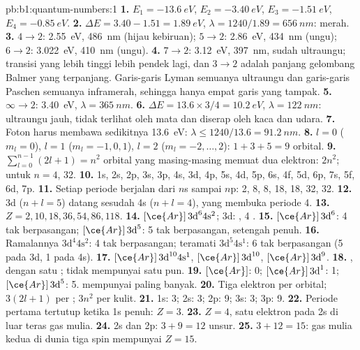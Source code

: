 \begin{solution}{pb:b1:quantum-numbers:1}
\textbf{1.} $E_1 = \qty{-13.6}{eV}$, $E_2 = \qty{-3.40}{eV}$,
$E_3 = \qty{-1.51}{eV}$, $E_4 = \qty{-0.85}{eV}$.
\textbf{2.} $\Delta E = 3.40 - 1.51 = \qty{1.89}{eV}$, $\lambda = 1240/1.89
= \qty{656}{nm}$: merah.
\textbf{3.} $4 \to 2$: \qty{2.55}{eV}, \qty{486}{nm} (hijau kebiruan);
$5 \to 2$: \qty{2.86}{eV}, \qty{434}{nm} (ungu); $6 \to 2$: \qty{3.022}{eV},
\qty{410}{nm} (ungu).
\textbf{4.} $7 \to 2$: \qty{3.12}{eV}, \qty{397}{nm}, sudah ultraungu;
transisi yang lebih tinggi lebih pendek lagi, dan $3 \to 2$ adalah panjang
gelombang Balmer yang terpanjang. Garis-garis Lyman semuanya ultraungu
dan garis-garis Paschen semuanya inframerah, sehingga hanya empat garis
yang tampak.
\textbf{5.} $\infty \to 2$: \qty{3.40}{eV}, $\lambda = \qty{365}{nm}$.
\textbf{6.} $\Delta E = 13.6 \times 3/4 = \qty{10.2}{eV}$, $\lambda =
\qty{122}{nm}$: ultraungu jauh, tidak terlihat oleh mata dan diserap oleh
kaca dan udara.
\textbf{7.} Foton harus membawa sedikitnya \qty{13.6}{eV}: $\lambda \le
1240/13.6 = \qty{91.2}{nm}$.
\textbf{8.} $l = 0$ ($m_l = 0$), $l = 1$ ($m_l = -1, 0, 1$), $l = 2$
($m_l = -2, \dots, 2$): $1 + 3 + 5 = 9$ orbital.
\textbf{9.} $\sum_{l=0}^{n-1}(2l+1) = n^2$ orbital yang masing-masing
memuat dua elektron: $2n^2$; untuk $n = 4$, 32.
\textbf{10.} 1s, 2s, 2p, 3s, 3p, 4s, 3d, 4p, 5s, 4d, 5p, 6s, 4f, 5d, 6p,
7s, 5f, 6d, 7p.
\textbf{11.} Setiap periode berjalan dari $n$s sampai $n$p: 2, 8, 8, 18,
18, 32, 32.
\textbf{12.} 3d ($n + l = 5$) datang sesudah 4s ($n + l = 4$), yang
membuka periode 4.
\textbf{13.} $Z = 2, 10, 18, 36, 54, 86, 118$.
\textbf{14.} $[\ce{Ar}]\,3\text{d}^6 4\text{s}^2$; 3d: ,
4 .
\textbf{15.}  $[\ce{Ar}]\,3\text{d}^6$: 4 tak berpasangan;
 $[\ce{Ar}]\,3\text{d}^5$: 5 tak berpasangan, 
setengah penuh.
\textbf{16.} Ramalannya $3\text{d}^4 4\text{s}^2$: 4 tak berpasangan;
teramati $3\text{d}^5 4\text{s}^1$: 6 tak berpasangan (5 pada 3d, 1 pada
4s).
\textbf{17.}  $[\ce{Ar}]\,3\text{d}^{10} 4\text{s}^1$, 
$[\ce{Ar}]\,3\text{d}^{10}$,  $[\ce{Ar}]\,3\text{d}^9$.
\textbf{18.} , dengan satu ; 
tidak mempunyai satu pun.
\textbf{19.}  $[\ce{Ar}]$: 0;  $[\ce{Ar}]\,3\text{d}^1$:
1;  $[\ce{Ar}]\,3\text{d}^5$: 5.  mempunyai paling
banyak.
\textbf{20.} Tiga elektron per orbital; $3(2l + 1)$ per ; $3n^2$
per kulit.
\textbf{21.} 1s: 3; 2s: 3; 2p: 9; 3s: 3; 3p: 9.
\textbf{22.} Periode pertama tertutup ketika 1s penuh: $Z = 3$.
\textbf{23.} $Z = 4$, satu elektron pada 2s di luar teras gas mulia.
\textbf{24.} 2s dan 2p: $3 + 9 = 12$ unsur.
\textbf{25.} $3 + 12 = 15$: gas mulia kedua di dunia tiga spin mempunyai
\textbf{$Z = 15$}.
\end{solution}
